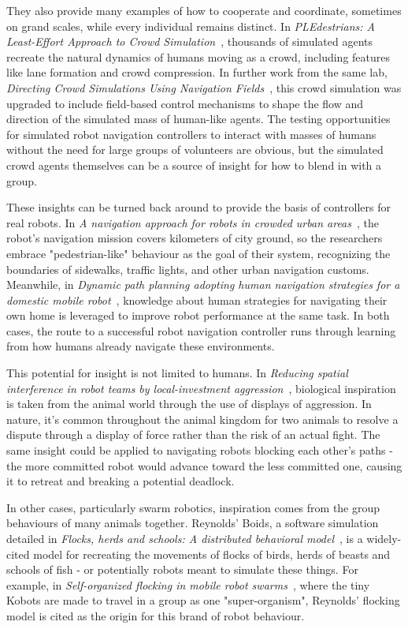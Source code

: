 \documentclass{sfuthesis}
\begin{document}
They also provide many examples of how to cooperate and coordinate, sometimes on grand scales, while every individual remains distinct. In \textit{PLEdestrians: A Least-Effort Approach to Crowd Simulation}~\cite{guy2010pledestrians}, thousands of simulated agents recreate the natural dynamics of humans moving as a crowd, including features like lane formation and crowd compression. In further work from the same lab, \textit{Directing Crowd Simulations Using Navigation Fields}~\cite{patil2011directing}, this crowd simulation was upgraded to include field-based control mechanisms to shape the flow and direction of the simulated mass of human-like agents. The testing opportunities for simulated robot navigation controllers to interact with masses of humans without the need for large groups of volunteers are obvious, but the simulated crowd agents themselves can be a source of insight for how to blend in with a group.

These insights can be turned back around to provide the basis of controllers for real robots. In \textit{A navigation approach for robots in crowded urban areas}~\cite{kummerle2013navigation}, the robot's navigation mission covers kilometers of city ground, so the researchers embrace "pedestrian-like" behaviour as the goal of their system, recognizing the boundaries of sidewalks, traffic lights, and other urban navigation customs. Meanwhile, in \textit{Dynamic path planning adopting human navigation strategies for a domestic mobile robot}~\cite{yuan2010dynamic}, knowledge about human strategies for navigating their own home is leveraged to improve robot performance at the same task. In both cases, the route to a successful robot navigation controller runs through learning from how humans already navigate these environments.

This potential for insight is not limited to humans. In \textit{Reducing spatial interference in robot teams by local-investment aggression}~\cite{zuluaga2005reducing}, biological inspiration is taken from the animal world through the use of displays of aggression. In nature, it's common throughout the animal kingdom for two animals to resolve a dispute through a display of force rather than the risk of an actual fight. The same insight could be applied to navigating robots blocking each other's paths - the more committed robot would advance toward the less committed one, causing it to retreat and breaking a potential deadlock. 

In other cases, particularly swarm robotics, inspiration comes from the group behaviours of many animals together. Reynolds' Boids, a software simulation detailed in \textit{Flocks, herds and schools: A distributed behavioral model}~\cite{reynolds1987flocks}, is a widely-cited model for recreating the movements of flocks of birds, herds of beasts and schools of fish - or potentially robots meant to simulate these things. For example, in \textit{Self-organized flocking in mobile robot swarms}~\cite{turgut2008self}, where the tiny Kobots are made to travel in a group as one "super-organism", Reynolds' flocking model is cited as the origin for this brand of robot behaviour.
\end{document}
